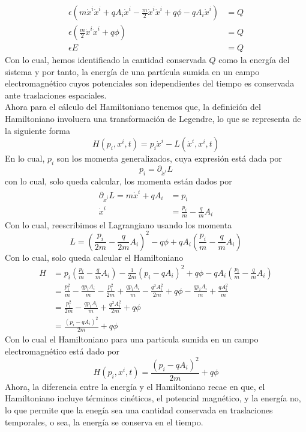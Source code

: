 \documentclass[../main_ej.tex]{subfiles}
\begin{document}
\begin{align*}
  \epsilon\left( m{\dot{x}^i}\dot{x}^i +qA_i\dot{x}^i  - \frac{m}{2}\dot{x}^i\dot{x}^i + q\phi - qA_i\dot{x}^i\right)  & = Q \\
  \epsilon \left( \frac{m}{2}\dot{x}^i\dot{x}^i + q\phi \right) & = Q \\
  \epsilon E  & = Q
\end{align*}
Con lo cual, hemos identificado la cantidad conservada $Q$ como la energía del sistema y por tanto, la energía de una partícula sumida en un campo electromagnético cuyos potenciales son idependientes del tiempo es conservada ante traslaciones espaciales. 
 \\
 Ahora para el cálculo del Hamiltoniano tenemos que, la definición del Hamiltoniano involucra una transformación de Legendre, lo que se representa de la siguiente forma
 \begin{equation}
   H(p_i,x^i,t) = p_i\dot{x}^i - L(\dot{x}^i,x^i,t)
\end{equation}
En lo cual, $p_i$ son los momenta generalizados, cuya expresión está dada por
\begin{equation*}
  p_i=\partial_{\dot{x}^i}L
\end{equation*}
con lo cual, solo queda calcular, los momenta están dados por 
\begin{align*}
  \partial_{\dot{x}^i}L  = m\dot{x}^i + qA_i  & = p_i \\
  \dot{x}^i & = \frac{p_i}{m} - \frac{q}{m}A_i
\end{align*}
Con lo cual, reescribimos el Lagrangiano usando los momenta
\begin{equation*}
  L = \left( \frac{p_i}{2m} - \frac{q}{2m}A_i \right)^2 -q\phi + qA_i\left( \frac{p_i}{m}-\frac{q}{m}A_i \right)
\end{equation*}
Con lo cual, solo queda calcular el Hamiltoniano
\begin{align*}
  H & = p_i\left(\frac{p_i}{m} -\frac{q}{m}A_i\right) -\frac{1}{2m}\left( p_i - qA_i \right)^2 +q\phi - qA_i\left( \frac{p_i}{m}-\frac{q}{m}A_i \right) \\
  & =  \frac{p_i^2}{m} - \frac{qp_iA_i}{m} - \frac{p_i^2}{2m} + \frac{qp_iA_i}{m} - \frac{q^2A_i^2}{2m} + q\phi -  \frac{qp_iA_i}{m} + \frac{qA_i^2}{m} \\
  & = \frac{p_i^2}{2m} - \frac{qp_iA_i}{m} + \frac{q^2A_i^2}{2m} + q\phi \\
  & = \frac{(p_i - qA_i)^2}{2m} + q\phi
\end{align*}
Con lo cual el Hamiltoniano para una particula sumida en un campo electromagnético está dado por
\begin{equation}
  H(p_i,x^i,t) = \frac{(p_i-qA_i)^2}{2m} + q\phi
\end{equation}
Ahora, la diferencia entre la energía y el Hamiltoniano recae en que, el Hamiltoniano incluye términos cinéticos, el potencial magnético, y la energía no, lo que permite que la enegía sea una cantidad conservada en traslaciones temporales, o sea, la energía se conserva en el tiempo. 
 
\end{document}
